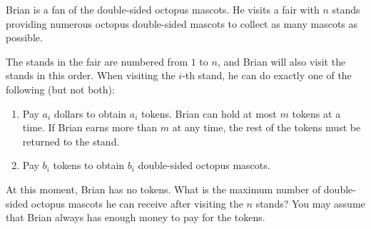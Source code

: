 Brian is a fan of the double-sided octopus mascots.
He visits a fair with $n$ stands providing numerous octopus double-sided mascots to collect as many mascots as possible.

The stands in the fair are numbered from $1$ to $n$, and Brian will also visit the stands in this order.
When visiting the $i$-th stand, he can do exactly one of the following (but not both):
\begin{enumerate}
    \item Pay $a_i$ dollars to obtain $a_i$ tokens. Brian can hold at most $m$ tokens at a time. If Brian earns more than $m$ at any time, the rest of the tokens must be returned to the stand.
    \item Pay $b_i$ tokens to obtain $b_i$ double-sided octopus mascots.
\end{enumerate}
At this moment, Brian has no tokens.
What is the maximum number of double-sided octopus mascots he can receive after visiting the $n$ stands?
You may assume that Brian always has enough money to pay for the tokens.